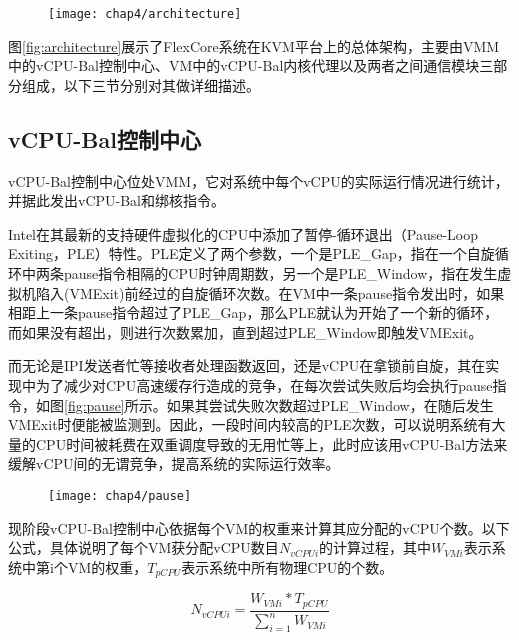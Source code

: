 \begin{figure}[!htp]
  \centering
  \texttt{[image: chap4/architecture]}
\end{figure}

图\ref{fig:architecture}展示了FlexCore系统在KVM平台上的总体架构，主要由VMM中的vCPU-Bal控制中心、VM中的vCPU-Bal内核代理以及两者之间通信模块三部分组成，以下三节分别对其做详细描述。

\subsection{vCPU-Bal控制中心}

vCPU-Bal控制中心位处VMM，它对系统中每个vCPU的实际运行情况进行统计，并据此发出vCPU-Bal和绑核指令。

Intel在其最新的支持硬件虚拟化的CPU中添加了暂停-循环退出（Pause-Loop Exiting，PLE）特性\cite{guide2010intel}。PLE定义了两个参数，一个是PLE\_Gap，指在一个自旋循环中两条pause指令相隔的CPU时钟周期数，另一个是PLE\_Window，指在发生虚拟机陷入(VMExit)前经过的自旋循环次数。在VM中一条pause指令发出时，如果相距上一条pause指令超过了PLE\_Gap，那么PLE就认为开始了一个新的循环，而如果没有超出，则进行次数累加，直到超过PLE\_Window即触发VMExit。

而无论是IPI发送者忙等接收者处理函数返回，还是vCPU在拿锁前自旋，其在实现中为了减少对CPU高速缓存行造成的竞争，在每次尝试失败后均会执行pause指令，如图\ref{fig:pause}所示。如果其尝试失败次数超过PLE\_Window，在随后发生VMExit时便能被监测到。因此，一段时间内较高的PLE次数，可以说明系统有大量的CPU时间被耗费在双重调度导致的无用忙等上，此时应该用vCPU-Bal方法来缓解vCPU间的无谓竞争，提高系统的实际运行效率。

\begin{figure}[!htp]
  \centering
  \texttt{[image: chap4/pause]}
\end{figure}

现阶段vCPU-Bal控制中心依据每个VM的权重来计算其应分配的vCPU个数。以下公式，具体说明了每个VM获分配vCPU数目$N_{vCPUi}$的计算过程，其中$W_{VMi}$表示系统中第i个VM的权重，$T_{pCPU}$表示系统中所有物理CPU的个数。

\begin{equation*}
N_{vCPUi} = \frac{W_{VMi} * T_{pCPU}}{\sum_{i=1}^n W_{VMi}}
\end{equation*}

